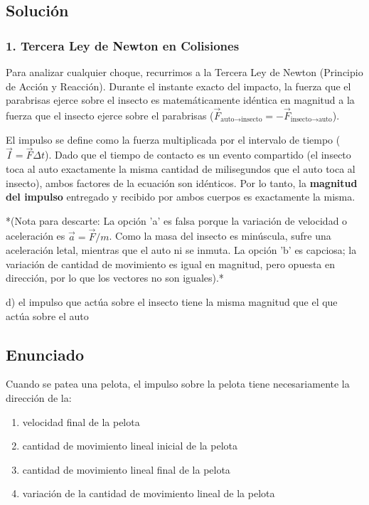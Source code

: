\documentclass[12pt, a4paper]{article}
\begin{document}
\subsection*{Solución}

\subsubsection*{1. Tercera Ley de Newton en Colisiones}
Para analizar cualquier choque, recurrimos a la Tercera Ley de Newton (Principio de Acción y Reacción). Durante el instante exacto del impacto, la fuerza que el parabrisas ejerce sobre el insecto es matemáticamente idéntica en magnitud a la fuerza que el insecto ejerce sobre el parabrisas ($\vec{F}_{\text{auto} \to \text{insecto}} = -\vec{F}_{\text{insecto} \to \text{auto}}$).

El impulso se define como la fuerza multiplicada por el intervalo de tiempo ($\vec{I} = \vec{F} \Delta t$). 
Dado que el tiempo de contacto es un evento compartido (el insecto toca al auto exactamente la misma cantidad de milisegundos que el auto toca al insecto), ambos factores de la ecuación son idénticos.
Por lo tanto, la \textbf{magnitud del impulso} entregado y recibido por ambos cuerpos es exactamente la misma. 

*(Nota para descarte: La opción 'a' es falsa porque la variación de velocidad o aceleración es $\vec{a} = \vec{F}/m$. Como la masa del insecto es minúscula, sufre una aceleración letal, mientras que el auto ni se inmuta. La opción 'b' es capciosa; la variación de cantidad de movimiento es igual en magnitud, pero opuesta en dirección, por lo que los vectores no son iguales).*

\begin{tcolorbox}[colback=green!5!white, colframe=green!50!black, title=Respuesta Final]
\centering \Large d) el impulso que actúa sobre el insecto tiene la misma magnitud que el que actúa sobre el auto
\end{tcolorbox}

\newpage

\subsection*{Enunciado}
Cuando se patea una pelota, el impulso sobre la pelota tiene necesariamente la dirección de la:
\begin{enumerate}[label=\alph*)]
    \item velocidad final de la pelota
    \item cantidad de movimiento lineal inicial de la pelota
    \item cantidad de movimiento lineal final de la pelota
    \item variación de la cantidad de movimiento lineal de la pelota
\end{enumerate}
\end{document}
